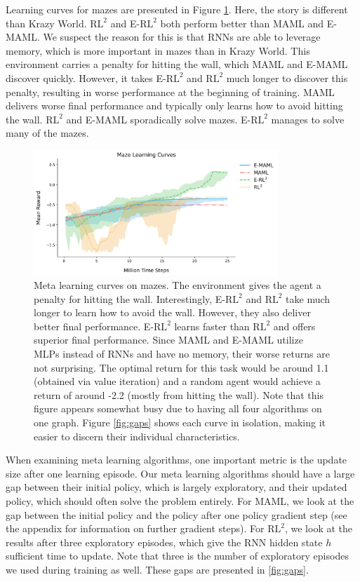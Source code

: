\documentclass{article} %
\begin{document}
Learning curves for mazes are presented in Figure \ref{fig:learning-curves-1}. Here, the story is different than Krazy World. $\text{RL}^2$ and E-$\text{RL}^2$ both perform better than MAML and E-MAML. We suspect the reason for this is that RNNs are able to leverage memory, which is more important in mazes than in Krazy World. This environment carries a penalty for hitting the wall, which MAML and E-MAML discover quickly. However, it takes E-$\text{RL}^2$ and $\text{RL}^2$ much longer to discover this penalty, resulting in worse performance at the beginning of training. MAML delivers worse final performance and typically only learns how to avoid hitting the wall. $\text{RL}^2$ and E-MAML sporadically solve mazes. E-$\text{RL}^2$ manages to solve many of the mazes. 
\begin{figure}[h]
\begin{center}
\includegraphics[width=0.82\textwidth]{ge_curves/Maze-Learning_Curves.png} 
\end{center}
\caption{Meta learning curves on mazes. The environment gives the agent a penalty for hitting the wall. Interestingly, E-$\text{RL}^2$ and $\text{RL}^2$ take much longer to learn how to avoid the wall. However, they also deliver better final performance. E-$\text{RL}^2$ learns faster than $\text{RL}^2$ and offers superior final performance. Since MAML and E-MAML utilize MLPs instead of RNNs and have no memory, their worse returns are not surprising. The optimal return for this task would be around 1.1 (obtained via value iteration) and a random agent would achieve a return of around -2.2 (mostly from hitting the wall). Note that this figure appears somewhat busy due to having all four algorithms on one graph. Figure \ref{fig:gaps} shows each curve in isolation, making it easier to discern their individual characteristics.} 
\label{fig:learning-curves-1}
\end{figure} 


When examining meta learning algorithms, one important metric is the update size after one learning episode. Our meta learning algorithms should have a large gap between their initial policy, which is largely exploratory, and their updated policy, which should often solve the problem entirely. For MAML, we look at the gap between the initial policy and the policy after one policy gradient step (see the appendix for information on further gradient steps). For $\text{RL}^2$, we look at the results after three exploratory episodes, which give the RNN hidden state $h$ sufficient time to update. Note that three is the number of exploratory episodes we used during training as well. These gaps are presented in \ref{fig:gaps}. 
\end{document}
